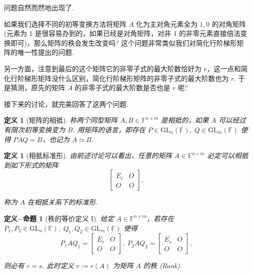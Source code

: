 \documentclass[10pt,openany]{article}
\theoremstyle{thmstyle} %
\theoremstyle{defstyle} %
\newtheorem{definition}[theorem]{定义}
\newtheorem{defprop}[theorem]{定义\(-\)命题}
\theoremstyle{prostyle} %
\theoremstyle{exastyle}
\theoremstyle{remstyle}
\newcommand{\F}{\mathbb{F}}
\newcommand{\gfn}{\text{GL}_n(\mathbb{F})}
\newcommand{\gfm}{\text{GL}_m(\mathbb{F})}
\newcommand{\nm}{^{n \times m}}
\begin{document}
问题自然而然地出现了. 

如果我们选择不同的初等变换方法将矩阵 \( A \) 化为主对角元素全为 \( 1,0  \) 的对角矩阵 (元素为 1 是很容易办到的，如果已经是对角矩阵，对非 1 的非零元素直接倍法变换即可)，那么矩阵的秩会发生改变吗? 这个问题非常类似我们对简化行阶梯形矩阵的唯一性提出的问题. 

另一方面，注意到最后的这个矩阵它的非零子式的最大阶数恰好为 \( r \)，这一点和简化行阶梯形矩阵没什么区别，简化行阶梯形矩阵的非零子式的最大阶数也为 \( r \). 于是猜测，原先的矩阵 \( A \) 的非零子式的最大阶数是否也是 \( r \) 呢?

接下来的讨论，就完美回答了这两个问题.

\begin{definition}[矩阵的相抵]
	称两个同型矩阵 \( A,B \in \F\nm \) 是相抵的，如果 \( A \) 可以经过有限次初等变换变为 \( B \). 用矩阵的语言，即存在 \( P \in \gfn, \; Q \in \gfm \) 使得 \( PAQ=B \)，也记为 \( A \simeq B \).
\end{definition}

\begin{definition}[相抵标准形]
	由前述讨论可以看出，任意的矩阵 \( A \in \F\nm \) 必定可以相抵到如下形式的矩阵
	\[ \begin{bmatrix}
		E_r & O \\
		O & O
	\end{bmatrix}, \]
	
	称为 \( A \) 在相抵关系下的标准形.
\end{definition}

\begin{defprop}[秩的等价定义 I] \label{3.1.3}
	给定 \( A \in \F\nm \)，若存在 \( P_1,P_2 \in \gfn, \; Q_1,Q_2 \in \gfm \) 使得
	\[ P_1AQ_1=\begin{bmatrix}
		E_r & O \\
		O & O
	\end{bmatrix}, \; P_2AQ_2=\begin{bmatrix}
	E_s & O \\
	O & O
	\end{bmatrix}, \]
	
	则必有 \( r=s \). 此时定义 \( r:=r(A) \) 为矩阵 \( A \) 的秩 (Rank).
\end{defprop}
\end{document}
